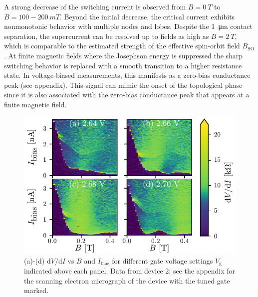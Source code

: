A strong decrease of the switching current is observed from $B=\SI{0}{T}$ to $B=100-\SI{200}{mT}$.
Beyond the initial decrease, the critical current exhibits nonmonotonic behavior with multiple nodes and lobes.
Despite the \SI{1}{\micro \meter} contact separation, the supercurrent can be resolved up to fields as high as $B=\SI{2}{T}$, which is comparable to the estimated strength of the effective spin-orbit field $B_\mathrm{SO}$.
At finite magnetic fields where the Josephson energy is suppressed the sharp switching behavior is replaced with a smooth transition to a higher resistance state.
In voltage-biased measurements, this manifests as a zero-bias conductance peak (see appendix).
This signal can mimic the onset of the topological phase since it is also associated with the zero-bias conductance peak that appears at a finite magnetic field.

\begin{figure}
\begin{center}
\includegraphics[width=0.7\columnwidth]{chapter_supercurrent/figures/fig2.pdf}
\caption{(a)-(d) $\mathrm{d}V/\mathrm{d}I$ vs $B$ and $I_\mathrm{bias}$ for different gate voltage settings $V_\mathrm{g}$ indicated above each panel.
Data from device 2; see the appendix for the scanning electron micrograph of the device with the tuned gate marked.}
\label{fig:figure2}
\end{center}
\end{figure}

